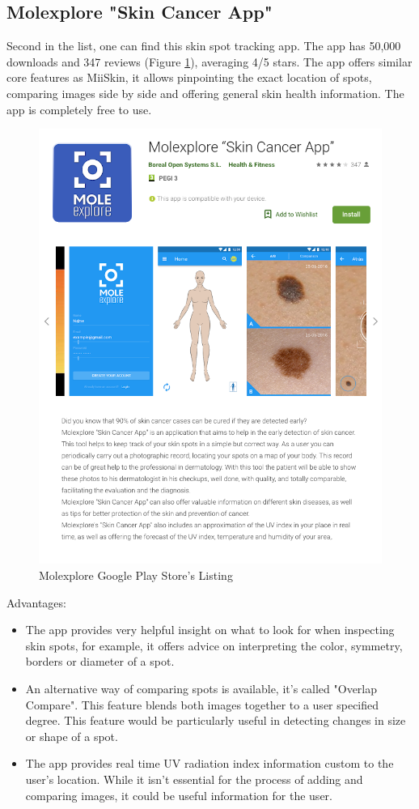 \subsection{Molexplore "Skin Cancer App"}
Second in the list, one can find this skin spot tracking app. The app has 50,000 downloads and 347 reviews (Figure \ref{fig:molexplore}), averaging 4/5 stars. The app offers similar core features as MiiSkin, it allows pinpointing the exact location of spots, comparing images side by side and offering general skin health information. The app is completely free to use.
\begin{figure}
    \includegraphics[width=1\textwidth, center]{figures/molexplore_listing.png}
    \caption{Molexplore Google Play Store's Listing}
    \label{fig:molexplore}
\end{figure}

Advantages:
\begin{itemize}
    \item The app provides very helpful insight on what to look for when inspecting skin spots, for example, it offers advice on interpreting the color, symmetry, borders or diameter of a spot.
    \item An alternative way of comparing spots is available, it's called "Overlap Compare". This feature blends both images together to a user specified degree. This feature would be particularly useful in detecting changes in size or shape of a spot.
    \item The app provides real time UV radiation index information custom to the user's location. While it isn't essential for the process of adding and comparing images, it could be useful information for the user.
\end{itemize}

